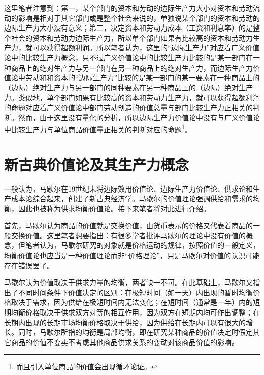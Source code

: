 这里笔者注意到：第一，某个部门的资本和劳动的边际生产力大小对资本和劳动流动的影响是相对于其它部门或是整个社会来说的，单独说某个部门的资本和劳动的边际生产力大小没有意义；第二，决定资本和劳动力成本（工资和利息率）的是整个社会的资本和劳动力边际生产力，所以单个部门如果有比较高的资本和劳动力生产力，就可以获得超额利润\cite[255]{KeLaKeCaiFuDeFenPei1983}。所以笔者认为，这里的“边际生产力”对应着广义价值论中的比较生产力概念，只不过广义价值论中的比较生产力比较的是某一部门在一种商品上的绝对生产力与另一部门在另一种商品上的绝对生产力，而边际生产力价值论中劳动和和资本的“边际生产力”比较的是某一部门的某一要素在一种商品上的（边际）绝对生产力与另一部门的同种要素在另一种商品上的（边际）绝对生产力。类似地，单个部门如果有比较高的资本和劳动力生产力，就可以获得超额利润的命题对应着广义价值论中部门劳动创造的价值总量与部门比较生产力正相关的判断。然而，由于这里没有量化的分析，所以边际生产力价值论中没有与广义价值论中比较生产力与单位商品价值量正相关的判断对应的命题\footnote{而且引入单位商品的价值会出现循环论证。}。

\section{新古典价值论及其生产力概念}

一般认为，马歇尔在19世纪末将边际效用价值论、边际生产力价值论、供求论和生产成本论综合起来，创建了新古典经济学\cite[295]{YanZhiJieXiFangJingJiXueShuoShiJiaoChengDiErBan2013}\cite[340]{YanZhiJieCongBianJiGeMingDaoKaiEnSiGeMing2022}\cite[i]{MaXieErJingJiXueYuanLi2019}\cite[183-184]{CaiJiMingCongGuDianZhengZhiJingJiXueDaoZhongGuoTeSeSheHuiZhuYiZhengZhiJingJiXueJiYuZhongGuoShiJiaoDeZhengZhiJingJiXueYanBianShangCe2023}。马歇尔的价值理论强调供给和需求的均衡，因此也被称为供求均衡价值论\cite[390]{YanZhiJieCongBianJiGeMingDaoKaiEnSiGeMing2022}。接下来笔者将对此进行介绍。

首先，马歇尔认为商品的价值就是交换价值，由货币表示的价格又代表着商品的一般交换价值\cite[86-87]{MaXieErJingJiXueYuanLi2019}。这里笔者想要指出：有很多学者批评马歇尔的理论中没有价值的概念\cite[299]{YanZhiJieXiFangJingJiXueShuoShiJiaoChengDiErBan2013}\cite[v]{MaXieErJingJiXueYuanLi2019}，但笔者认为，马歇尔研究的对象就是价格运动的规律，按照价值的一般定义，均衡价值论也应当是一种价值理论而非“价格理论”，只是马歇尔对价值的认识可能存在错误罢了。

马歇尔认为价值取决于供求力量的均衡，两者缺一不可。在此基础上，马歇尔又指出了不同时间条件下价值决定的区别：在极短时间（如一天）内出现的暂时均衡价格取决于需求，因为供给在极短时间内无法变化；在短时间（通常是一年）内的短期均衡价格取决于供求双方对等的相互作用，因为双方在短期内均可作出调整；在长期内出现的长期市场均衡价格取决于供给，因为供给在长期内可以有很大的增长\cite[299-300]{YanZhiJieXiFangJingJiXueShuoShiJiaoChengDiErBan2013}\cite[390]{YanZhiJieCongBianJiGeMingDaoKaiEnSiGeMing2022}。同时，马歇尔所指的均衡是局部均衡，即在研究某种商品的价值决定时假定其它商品的价值不变卖不考虑其他商品供求关系的变动对该商品价值的影响\cite[391]{YanZhiJieCongBianJiGeMingDaoKaiEnSiGeMing2022}。

